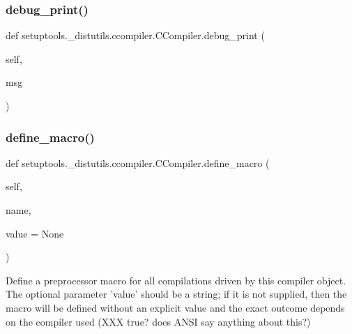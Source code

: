 \subsubsection{\texorpdfstring{debug\+\_\+print()}{debug\_print()}}
{\footnotesize\ttfamily def setuptools.\+\_\+distutils.\+ccompiler.\+C\+Compiler.\+debug\+\_\+print (\begin{DoxyParamCaption}\item[{}]{self,  }\item[{}]{msg }\end{DoxyParamCaption})}

\mbox{\label{classsetuptools_1_1__distutils_1_1ccompiler_1_1CCompiler_a217663e09d8712e2c329a2be61bda4dc}} 
\subsubsection{\texorpdfstring{define\+\_\+macro()}{define\_macro()}}
{\footnotesize\ttfamily def setuptools.\+\_\+distutils.\+ccompiler.\+C\+Compiler.\+define\+\_\+macro (\begin{DoxyParamCaption}\item[{}]{self,  }\item[{}]{name,  }\item[{}]{value = {\ttfamily None} }\end{DoxyParamCaption})}

\begin{DoxyVerb}Define a preprocessor macro for all compilations driven by this
compiler object.  The optional parameter 'value' should be a
string; if it is not supplied, then the macro will be defined
without an explicit value and the exact outcome depends on the
compiler used (XXX true? does ANSI say anything about this?)
\end{DoxyVerb}
 \mbox{\label{classsetuptools_1_1__distutils_1_1ccompiler_1_1CCompiler_a7f95d8a83986135140f415968814fd41}} 
